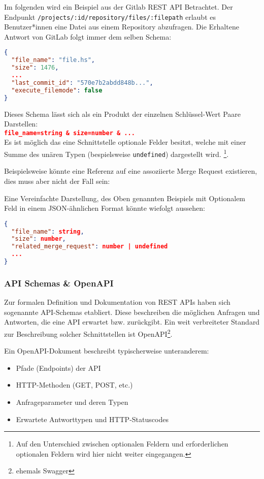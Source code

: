 Im folgenden wird ein Beispiel aus der Gitlab REST API Betrachtet. Der Endpunkt \texttt{/projects/:id/repository/files/:filepath} erlaubt es
Benutzer*innen eine Datei aus einem Repository abzufragen. Die Erhaltene Antwort von GitLab folgt immer dem selben Schema:
\begin{lstlisting}[language=json]
{
  "file_name": "file.hs",
  "size": 1476,
  ...
  "last_commit_id": "570e7b2abdd848b...",
  "execute_filemode": false
}
\end{lstlisting}

Dieses Schema lässt sich als ein Produkt der einzelnen Schlüssel-Wert Paare Darstellen: \\
\lstinline[language=json]|file_name=string & size=number & ...|\\

Es ist möglich das eine Schnittstelle optionale Felder besitzt, welche mit einer Summe 
des unären Typen (bespielsweise \texttt{undefined}) dargestellt wird.
\footnote{Auf den Unterschied zwischen optionalen Feldern und erforderlichen optionalen Feldern wird hier nicht weiter eingegangen.}.

Beispielsweise könnte eine Referenz auf eine assoziierte Merge Request existieren, dies muss aber nicht der Fall sein:

Eine Vereinfachte Darstellung, des Oben genannten Beispiels mit Optionalem Feld 
in einem JSON-ähnlichen Format könnte wiefolgt aussehen:

\begin{lstlisting}[language=json]
{
  "file_name": string,
  "size": number,
  "related_merge_request": number | undefined
  ...
}
\end{lstlisting}

\subsubsection{API Schemas \& OpenAPI}

Zur formalen Definition und Dokumentation\cite{10.1145/2577080.2577098} von REST APIs haben sich sogenannte API-Schemas etabliert.
Diese beschreiben die möglichen Anfragen und Antworten, die eine API erwartet bzw. zurückgibt.
Ein weit verbreiteter Standard zur Beschreibung solcher Schnittstellen ist OpenAPI\footnote{ehemals Swagger}.\cite{Ed-douibiHamza2018OATt}\cite{BognerJustus2023DRAd}\cite{9650408}

Ein OpenAPI-Dokument beschreibt typischerweise unteranderem:
\begin{itemize}
    \item Pfade (Endpoints) der API
    \item HTTP-Methoden (GET, POST, etc.)
    \item Anfrageparameter und deren Typen
    \item Erwartete Antworttypen und HTTP-Statuscodes
\end{itemize}

